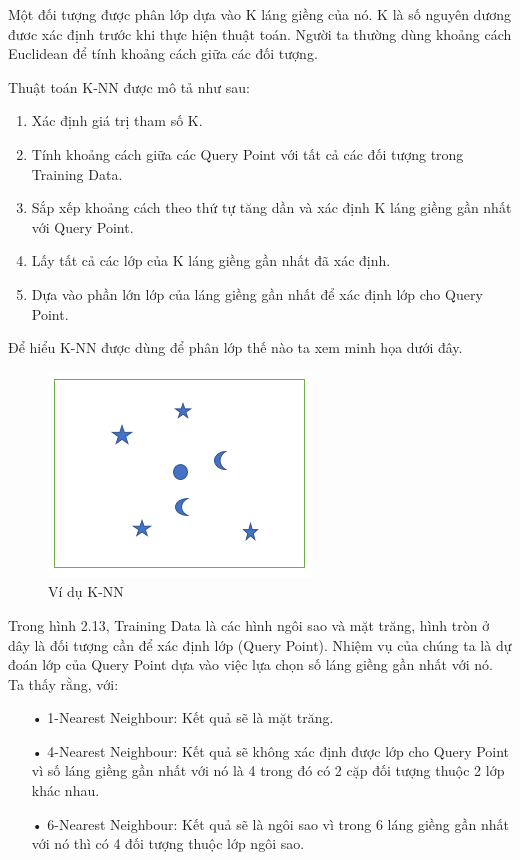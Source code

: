 \documentclass[12pt,a4paper]{article}
\begin{document}
Một đối tượng được phân lớp dựa vào K láng giềng của nó. K là số nguyên dương đươc xác định trước khi thực hiện thuật toán. Người ta thường dùng khoảng cách Euclidean để tính khoảng cách giữa các đối tượng.

Thuật toán K-NN được mô tả như sau:
\begin{enumerate}
\item Xác định giá trị tham số K.
\item Tính khoảng cách giữa các Query Point với tất cả các đối tượng trong Training Data.
\item Sắp xếp khoảng cách theo thứ tự tăng dần và xác định K láng giềng gần nhất với Query Point.
\item Lấy tất cả các lớp của K láng giềng gần nhất đã xác định.
\item Dựa vào phần lớn lớp của láng giềng gần nhất để xác định lớp cho Query Point.
\end{enumerate}
Để hiểu K-NN được dùng để phân lớp thế nào ta xem minh họa dưới đây.
\begin{center}
    \begin{figure}[htp]
    \begin{center}
    \includegraphics[scale=.5]{Images/KNN}
    \end{center}
    \caption{Ví dụ K-NN}
    \end{figure}
\end{center}
Trong hình 2.13, Training Data là các hình ngôi sao và mặt trăng, hình tròn ở dây là đối tượng cần để xác định lớp (Query Point). Nhiệm vụ của chúng ta là dự đoán lớp của Query Point dựa vào việc lựa chọn số láng giềng gần nhất với nó.\\Ta thấy rằng, với:
\begin{itemize}
\item[•] 1-Nearest Neighbour: Kết quả sẽ là mặt trăng.
\item[•] 4-Nearest Neighbour: Kết quả sẽ không xác định được lớp cho Query Point vì số láng giềng gần nhất với nó là 4 trong đó có 2 cặp đối tượng thuộc 2 lớp khác nhau.
\item[•] 6-Nearest Neighbour: Kết quả sẽ là ngôi sao vì trong 6 láng giềng gần nhất với nó thì có 4 đối tượng thuộc lớp ngôi sao. 
\end{itemize}
\end{document}
